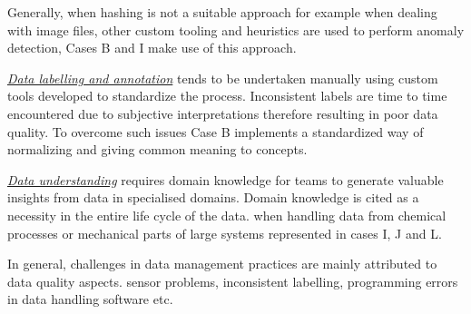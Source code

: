 Generally, when hashing is not a suitable approach for example when dealing with image files, other custom tooling and heuristics are used to perform anomaly detection, Cases B and I make use of this approach. %

% 


\underline{\emph{Data labelling and annotation}} tends to be undertaken manually using custom tools developed to standardize the process. %
Inconsistent labels are time to time encountered due to subjective interpretations therefore resulting in poor data quality. To overcome such issues Case B implements a standardized way of normalizing and giving common meaning to concepts. %

\underline{\emph{Data understanding}} requires domain knowledge for teams to generate valuable insights from data in specialised domains. Domain knowledge is cited as a necessity in the entire life cycle of the data. \DIFdelbegin {}\DIFdelend \DIFaddbegin {}\DIFaddend when handling data from chemical processes or mechanical parts of large systems represented in cases I, J and L. %

In general, challenges in data management practices are mainly attributed to data quality aspects. \DIFdelbegin {}\DIFdelend \DIFaddbegin {}\DIFaddend sensor problems, inconsistent labelling, programming errors in data handling software etc.



